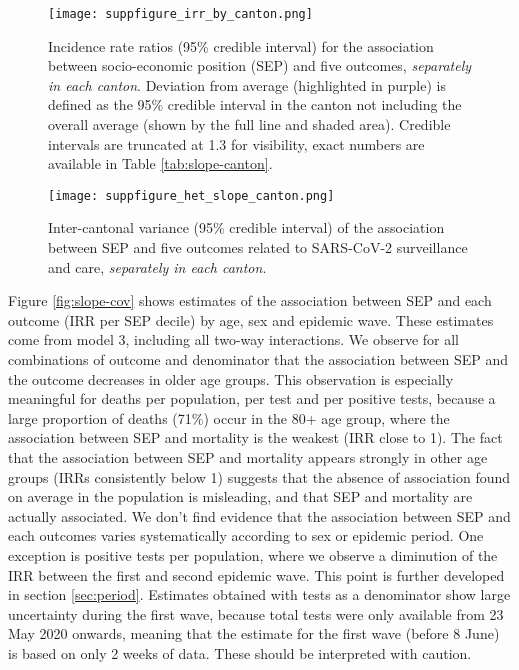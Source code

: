 \documentclass{article}
\begin{document}
	\begin{figure}[H]
		\centering
		\texttt{[image: suppfigure\_irr\_by\_canton.png]}
		\caption{Incidence rate ratios (95\% credible interval) for the association between socio-economic position (SEP) and five outcomes, \textit{separately in each canton}. Deviation from average (highlighted in purple) is defined as the 95\% credible interval in the canton not including the overall average (shown by the full line and shaded area). Credible intervals are truncated at 1.3 for visibility, exact numbers are available in Table \ref{tab:slope-canton}.}
		\label{fig:slope-canton}
	\end{figure}

	\begin{figure}[H]
	\centering
	\texttt{[image: suppfigure\_het\_slope\_canton.png]}
	\caption{Inter-cantonal variance (95\% credible interval) of the association between SEP and five outcomes related to SARS-CoV-2 surveillance and care, \textit{separately in each canton}.}
	\label{fig:het-slope-canton}
\end{figure}
	
	Figure \ref{fig:slope-cov} shows estimates of the association between SEP and each outcome (IRR per SEP decile) by age, sex and epidemic wave. 
	These estimates come from  model 3, including all two-way interactions.
	We observe for all combinations of outcome and denominator that the association between SEP and the outcome decreases in older age groups.
	This observation is especially meaningful for deaths per population, per test and per positive tests, because a large proportion of deaths (71\%) occur in the 80+ age group, where the association between SEP and mortality is the weakest (IRR close to 1).
	The fact that the association between SEP and mortality appears strongly in other age groups (IRRs consistently below 1) suggests that the absence of association found on average in the population is misleading, and that SEP and mortality are actually associated.
	We don't find evidence that the association between SEP and each outcomes varies systematically according to sex or epidemic period.
	One exception is positive tests per population, where we observe a diminution of the IRR between the first and second epidemic wave. 
	This point is further developed in section \ref{sec:period}.
	Estimates obtained with tests as a denominator show large uncertainty during the first wave, because total tests were only available from 23 May 2020 onwards, meaning that the estimate for the first wave (before 8 June) is based on only 2 weeks of data. 
	These should be interpreted with caution.
	
\end{document}
